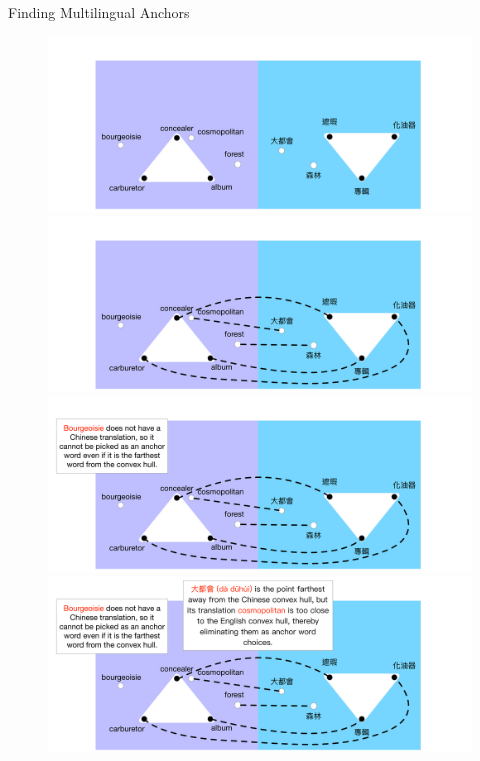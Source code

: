 \begin{frame}{Finding Multilingual Anchors}
\begin{figure}
\begin{overprint}
 \centerline{\includegraphics[width=\textwidth]{topic_models/mtanchor/multi_anchors1.pdf}}
 \centerline{\includegraphics[width=\textwidth]{topic_models/mtanchor/multi_anchors2.pdf}}
 \centerline{\includegraphics[width=\textwidth]{topic_models/mtanchor/multi_anchors3.pdf}}
 \centerline{\includegraphics[width=\textwidth]{topic_models/mtanchor/multi_anchors4.pdf}}

\end{overprint}
\end{figure}
\end{frame}
